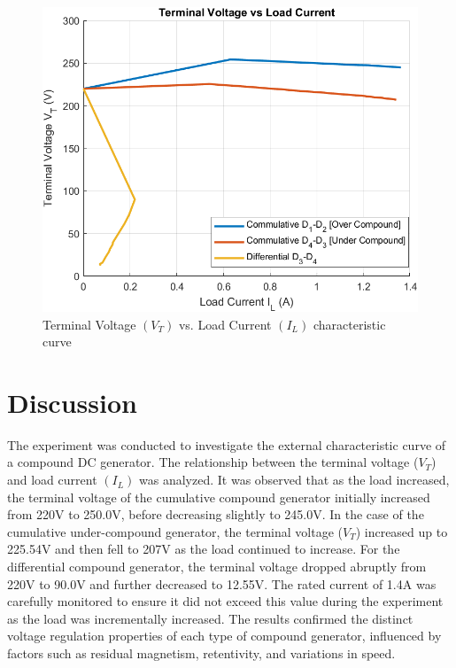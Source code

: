 \documentclass[a4paper,12pt]{article}
\begin{document}
\begin{figure}[H]
	\centering
	\includegraphics[width=0.9\linewidth]{Images/1}
	\caption{Terminal Voltage $(V_T)$ vs. Load Current $(I_L)$ characteristic curve}
	\label{fig:1}
\end{figure}
	\section{Discussion}
	The experiment was conducted to investigate the external characteristic curve of a compound DC generator. The relationship between the terminal voltage ($V_T$) and load current $(I_L)$ was analyzed. It was observed that as the load increased, the terminal voltage of the cumulative compound generator initially increased from 220V to 250.0V, before decreasing slightly to 245.0V. In the case of the cumulative under-compound generator, the terminal voltage ($V_T$) increased up to 225.54V and then fell to 207V as the load continued to increase. For the differential compound generator, the terminal voltage dropped abruptly from 220V to 90.0V and further decreased to 12.55V. The rated current of 1.4A was carefully monitored to ensure it did not exceed this value during the experiment as the load was incrementally increased. The results confirmed the distinct voltage regulation properties of each type of compound generator, influenced by factors such as residual magnetism, retentivity, and variations in speed.
\end{document}
